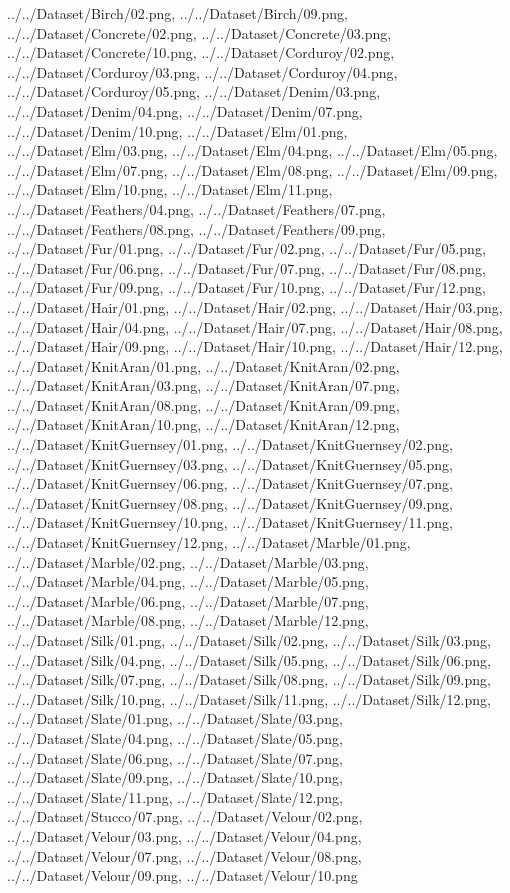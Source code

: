 \documentclass[12pt,a4paper]{article}
\begin{document}
\begin{singlespace}
{../../Dataset/Birch/02.png,
../../Dataset/Birch/09.png,
../../Dataset/Concrete/02.png,
../../Dataset/Concrete/03.png,
../../Dataset/Concrete/10.png,
../../Dataset/Corduroy/02.png,
../../Dataset/Corduroy/03.png,
../../Dataset/Corduroy/04.png,
../../Dataset/Corduroy/05.png,
../../Dataset/Denim/03.png,
../../Dataset/Denim/04.png,
../../Dataset/Denim/07.png,
../../Dataset/Denim/10.png,
../../Dataset/Elm/01.png,
../../Dataset/Elm/03.png,
../../Dataset/Elm/04.png,
../../Dataset/Elm/05.png,
../../Dataset/Elm/07.png,
../../Dataset/Elm/08.png,
../../Dataset/Elm/09.png,
../../Dataset/Elm/10.png,
../../Dataset/Elm/11.png,
../../Dataset/Feathers/04.png,
../../Dataset/Feathers/07.png,
../../Dataset/Feathers/08.png,
../../Dataset/Feathers/09.png,
../../Dataset/Fur/01.png,
../../Dataset/Fur/02.png,
../../Dataset/Fur/05.png,
../../Dataset/Fur/06.png,
../../Dataset/Fur/07.png,
../../Dataset/Fur/08.png,
../../Dataset/Fur/09.png,
../../Dataset/Fur/10.png,
../../Dataset/Fur/12.png,
../../Dataset/Hair/01.png,
../../Dataset/Hair/02.png,
../../Dataset/Hair/03.png,
../../Dataset/Hair/04.png,
../../Dataset/Hair/07.png,
../../Dataset/Hair/08.png,
../../Dataset/Hair/09.png,
../../Dataset/Hair/10.png,
../../Dataset/Hair/12.png,
../../Dataset/KnitAran/01.png,
../../Dataset/KnitAran/02.png,
../../Dataset/KnitAran/03.png,
../../Dataset/KnitAran/07.png,
../../Dataset/KnitAran/08.png,
../../Dataset/KnitAran/09.png,
../../Dataset/KnitAran/10.png,
../../Dataset/KnitAran/12.png,
../../Dataset/KnitGuernsey/01.png,
../../Dataset/KnitGuernsey/02.png,
../../Dataset/KnitGuernsey/03.png,
../../Dataset/KnitGuernsey/05.png,
../../Dataset/KnitGuernsey/06.png,
../../Dataset/KnitGuernsey/07.png,
../../Dataset/KnitGuernsey/08.png,
../../Dataset/KnitGuernsey/09.png,
../../Dataset/KnitGuernsey/10.png,
../../Dataset/KnitGuernsey/11.png,
../../Dataset/KnitGuernsey/12.png,
../../Dataset/Marble/01.png,
../../Dataset/Marble/02.png,
../../Dataset/Marble/03.png,
../../Dataset/Marble/04.png,
../../Dataset/Marble/05.png,
../../Dataset/Marble/06.png,
../../Dataset/Marble/07.png,
../../Dataset/Marble/08.png,
../../Dataset/Marble/12.png,
../../Dataset/Silk/01.png,
../../Dataset/Silk/02.png,
../../Dataset/Silk/03.png,
../../Dataset/Silk/04.png,
../../Dataset/Silk/05.png,
../../Dataset/Silk/06.png,
../../Dataset/Silk/07.png,
../../Dataset/Silk/08.png,
../../Dataset/Silk/09.png,
../../Dataset/Silk/10.png,
../../Dataset/Silk/11.png,
../../Dataset/Silk/12.png,
../../Dataset/Slate/01.png,
../../Dataset/Slate/03.png,
../../Dataset/Slate/04.png,
../../Dataset/Slate/05.png,
../../Dataset/Slate/06.png,
../../Dataset/Slate/07.png,
../../Dataset/Slate/09.png,
../../Dataset/Slate/10.png,
../../Dataset/Slate/11.png,
../../Dataset/Slate/12.png,
../../Dataset/Stucco/07.png,
../../Dataset/Velour/02.png,
../../Dataset/Velour/03.png,
../../Dataset/Velour/04.png,
../../Dataset/Velour/07.png,
../../Dataset/Velour/08.png,
../../Dataset/Velour/09.png,
../../Dataset/Velour/10.png}


\end{singlespace}
\end{document}

